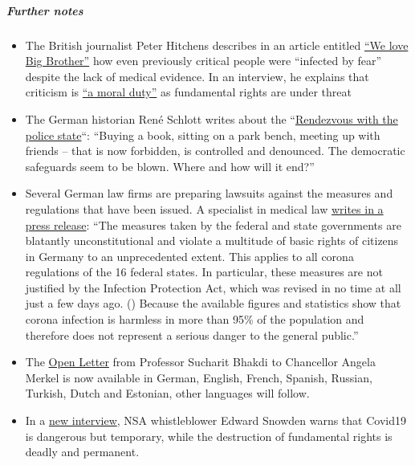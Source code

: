 \hypertarget{further-notes-1}{%
\subparagraph{\texorpdfstring{\textbf{Further
notes}}{Further notes}}\label{further-notes-1}}

\begin{itemize}
\tightlist
\item
  The British journalist Peter Hitchens describes in an article entitled
  \href{https://www.firstthings.com/web-exclusives/2020/04/we-love-big-brother}{``We
  love Big Brother''} how even previously critical people were
  ``infected by fear'' despite the lack of medical evidence. In an
  interview, he explains that criticism is
  \href{https://www.spiked-online.com/podcast-episode/in-this-lockdown-dissent-is-a-moral-duty/}{``a
  moral duty''} as fundamental rights are under threat
\item
  The German historian René Schlott writes about the
  ``\href{https://www.spiegel.de/politik/deutschland/corona-krise-und-buergerrechte-rendezvous-mit-dem-polizeistaat-a-68611322-f4d4-453f-aba5-5ec5a49ae329}{Rendezvous
  with the police state}``: ``Buying a book, sitting on a park bench,
  meeting up with friends -- that is now forbidden, is controlled and
  denounced. The democratic safeguards seem to be blown. Where and how
  will it end?''
\item
  Several German law firms are preparing lawsuits against the measures
  and regulations that have been issued. A specialist in medical law
  \href{http://beatebahner.de/lib.medien/aktualisierte\%20Pressemitteilung.pdf}{writes
  in a press release}: ``The measures taken by the federal and state
  governments are blatantly unconstitutional and violate a multitude of
  basic rights of citizens in Germany to an unprecedented extent. This
  applies to all corona regulations of the 16 federal states. In
  particular, these measures are not justified by the Infection
  Protection Act, which was revised in no time at all just a few days
  ago. () Because the available figures and statistics show that corona
  infection is harmless in more than 95\% of the population and
  therefore does not represent a serious danger to the general public.''
\item
  The
  \href{https://swprs.org/open-letter-from-professor-sucharit-bhakdi-to-german-chancellor-dr-angela-merkel/}{Open
  Letter} from Professor Sucharit Bhakdi to Chancellor Angela Merkel is
  now available in German, English, French, Spanish, Russian, Turkish,
  Dutch and Estonian, other languages will follow.
\item
  In a \href{https://www.youtube.com/watch?v=-pcQFTzck_c}{new
  interview}, NSA whistleblower Edward Snowden warns that Covid19 is
  dangerous but temporary, while the destruction of fundamental rights
  is deadly and permanent.
\end{itemize}

